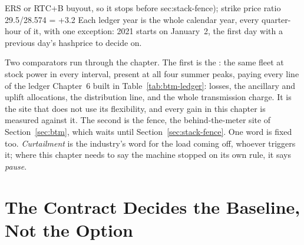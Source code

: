 ERS or RTC+B buyout, so it stops before sec:stack-fence); strike price ratio 29.5/28.574 = +3.2%
Each ledger year is the whole calendar year, every quarter-hour of it, with one exception: 2021 starts on January~2, the first day with a previous day's hashprice to decide on. %

Two comparators run through the chapter. The first is the : the same fleet at stock power in every interval, present at all four summer peaks, paying every line of the ledger Chapter~6 built in Table~\ref{tab:btm-ledger}: losses, the ancillary and uplift allocations, the distribution line, and the whole transmission charge. It is the site that does not use its flexibility, and every gain in this chapter is measured against it. The second is the fence, the behind-the-meter site of Section~\ref{sec:btm}, which waits until Section~\ref{sec:stack-fence}. One word is fixed too. \emph{Curtailment} is the industry's word for the load coming off, whoever triggers it; where this chapter needs to say the machine stopped on its own rule, it says \emph{pause}.

\section{The Contract Decides the Baseline, Not the Option}
\label{sec:stack-contract}

